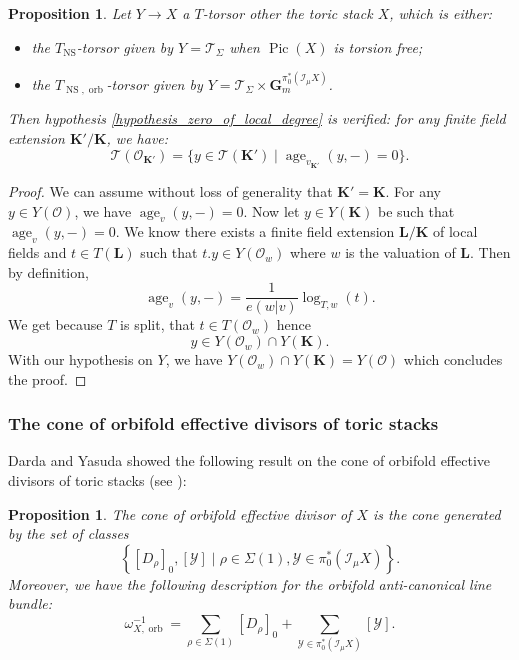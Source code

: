 \documentclass{proc-l}
\newcommand{\K}{\mathbf{K}}
\newcommand{\Le}{\mathbf{L}}
\newcommand{\G}{\mathbf{G}}
\DeclareMathOperator{\Pic}{Pic}
\DeclareMathOperator{\age}{age}
\DeclareMathOperator{\NS}{NS}
\DeclareMathOperator{\orb}{orb}
\newcommand{\stackY}{\mathcal{Y}}
\newcommand{\stackT}{\mathcal{T}}
\newcommand{\sheafI}{\mathcal{I}}
\newcommand{\sheafO}{\mathcal{O}}
\newcommand{\w}{\omega}
\newcommand{\twistsector}{\pi_0^*(\sheafI_{\mu} X)}
\newtheorem{prop}[theorem]{Proposition}
\theoremstyle{definition}
\theoremstyle{remark}
\numberwithin{equation}{section}
\begin{document}
\begin{prop}\label{prop_extended_univ_torsor_zero_age}
    Let $Y \rightarrow X$ a $T$-torsor other the toric stack $X$, which is either:
    \begin{itemize}
        \item the $T_{\NS}$-torsor given by $Y = \stackT_{\Sigma}$ when $\Pic(X)$ is torsion free;
        \item the $T_{\NS,\orb}$-torsor given by $Y = \stackT_{\Sigma} \times \G_m^{\twistsector}$.
    \end{itemize}
     Then hypothesis \ref{hypothesis_zero_of_local_degree} is verified: for any finite field extension $\K' / \K$, we have:
    $$\stackT(\sheafO_{\K'}) = \{y \in \stackT(\K') \mid \age_{v_{\K'}}(y,-) = 0 \} . $$
\end{prop}

\begin{proof}
    We can assume without loss of generality that $\K' = \K$. For any $y \in Y(\sheafO)$, we have $\age_v(y,-) = 0$. Now let $y \in Y(\K)$ be such that $\age_v(y,-) = 0$. We know there exists a finite field extension $\Le/ \K$ of local fields and $t \in T(\Le)$ such that $t.y \in Y(\sheafO_w)$ where $w$ is the valuation of $\Le$. Then by definition, $$\age_v(y,-) = \frac{1}{e(w|v)} \log_{T,w}(t) .$$We get because $T$ is split, that $t \in T(\sheafO_w)$ hence $$y \in Y(\sheafO_w) \cap Y(\K) .$$With our hypothesis on $Y$, we have $Y(\sheafO_w) \cap Y(\K) = Y(\sheafO)$ which concludes the proof.
\end{proof}





\subsubsection{The cone of orbifold effective divisors of toric stacks}

Darda and Yasuda showed the following result on the cone of orbifold effective divisors of toric stacks (see \cite[Theorem 1.1]{darda2025orbifoldpseudoeffectiveconestoric}):

\begin{prop}\label{proposition_description_cone_orbifold_effective_divisor_toric_stack}
    The cone of  orbifold effective divisor of $X$ is the cone generated by the set of classes $$\left\{ [D_{\rho}]_{0},[\stackY] \mid \rho \in \Sigma(1), \stackY \in \twistsector \right\}.$$ Moreover, we have the following description for the orbifold anti-canonical line bundle:
$$\w_{X,\orb}^{-1} = \sum\limits_{\rho \in \Sigma(1)} [D_{\rho}]_{0} + \sum\limits_{\stackY \in \twistsector} [\stackY] .$$
\end{prop}
\end{document}
